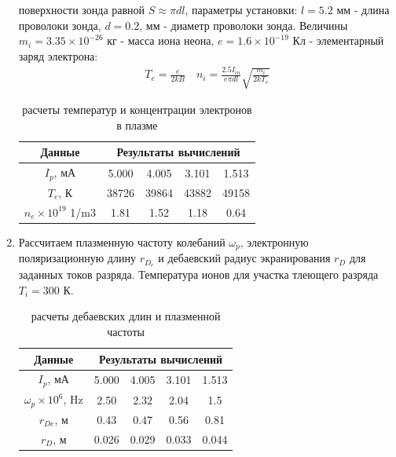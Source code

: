 \documentclass[a4paper, 12pt]{article}
\begin{document}
\begin{enumerate}
    поверхности зонда равной $S \approx \pi dl$, параметры установки: $l = 5.2$ мм - длина проволоки зонда, $d = 0.2$, мм - диаметр проволоки зонда. Величины $m_{i} = 3.35\times 10^{-26}$ кг - масса иона неона, $e = 1.6\times 10^{-19}$ Кл
    - элементарный заряд электрона:
    \begin{align*}
        T_{e} = \frac{e}{2kB} \quad n_{i} = \frac{2.5I_{in}}{e\pi dl}\sqrt{\frac{m_{i}}{2kT_{e}}}
    \end{align*}
    \begin{table}[H]
        \centering
        \begin{tabular}{|c|c|c|c|c|}
            \hline
            Данные & \multicolumn{4}{|c|}{Результаты вычислений}\\
            \hline
            $I_{p}$, мА & 5.000 & 4.005 & 3.101 & 1.513\\
            $T_{e}$, К & 38726 & 39864 & 43882 & 49158\\
            $n_{e}\times 10^{19}$ 1/m3 & 1.81 & 1.52 & 1.18 & 0.64\\
            \hline
        \end{tabular}
        \caption{расчеты температур и концентрации электронов в плазме}
        \label{расчеты температур и концентрации электронов в плазме}
    \end{table}
    \item Рассчитаем плазменную частоту колебаний $\omega_{p}$, электронную поляризационную длину $r_{D_{e}}$ и дебаевский радиус экранирования $r_{D}$ для заданных токов разряда.
    Температура ионов для участка тлеющего разряда $T_{i} = 300$ К.
    \begin{table}[H]
        \centering
        \begin{tabular}{|c|c|c|c|c|}
            \hline
            Данные & \multicolumn{4}{|c|}{Результаты вычислений}\\
            \hline
            $I_{p}$, мА & 5.000 & 4.005 & 3.101 & 1.513\\
            $\omega_{p}\times 10^{6}$, Hz & 2.50 & 2.32 & 2.04 & 1.5\\
            $r_{De}$, м & 0.43 & 0.47 & 0.56 & 0.81\\
            $r_{D}$, м & 0.026 & 0.029 & 0.033 & 0.044\\
            \hline
        \end{tabular}
        \caption{расчеты дебаевских длин и плазменной частоты}
        \label{расчеты дебаевских длин и плазменной частоты}
    \end{table}

\end{enumerate}
\end{document}
